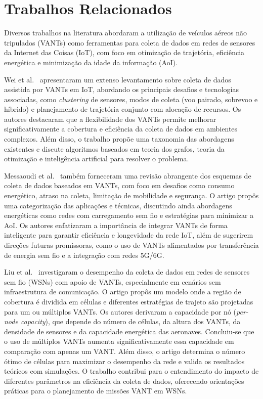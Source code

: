 \chapter{Trabalhos Relacionados}
\label{sec:relacionados}

Diversos trabalhos na literatura abordaram a utilização de veículos aéreos não tripulados (VANTs) como ferramentas para coleta de dados em redes de sensores da Internet das Coisas (IoT), com foco em otimização de trajetória, eficiência energética e minimização da idade da informação (AoI).

Wei et al.~\cite{wei2022survey} apresentaram um extenso levantamento sobre coleta de dados assistida por VANTs em IoT, abordando os principais desafios e tecnologias associadas, como \textit{clustering} de sensores, modos de coleta (voo pairado, sobrevoo e híbrido) e planejamento de trajetória conjunto com alocação de recursos. Os autores destacaram que a flexibilidade dos VANTs permite melhorar significativamente a cobertura e eficiência da coleta de dados em ambientes complexos. Além disso, o trabalho propõe uma taxonomia das abordagens existentes e discute algoritmos baseados em teoria dos grafos, teoria da otimização e inteligência artificial para resolver o problema.

Messaoudi et al.~\cite{messaoudi2023survey} também forneceram uma revisão abrangente dos esquemas de coleta de dados baseados em VANTs, com foco em desafios como consumo energético, atraso na coleta, limitação de mobilidade e segurança. O artigo propôs uma categorização das aplicações e técnicas, discutindo ainda abordagens energéticas como redes com carregamento sem fio e estratégias para minimizar a AoI. Os autores enfatizaram a importância de integrar VANTs de forma inteligente para garantir eficiência e longevidade da rede IoT, além de sugerirem direções futuras promissoras, como o uso de VANTs alimentados por transferência de energia sem fio e a integração com redes 5G/6G.

Liu et al.~\cite{liu2018uavWSN} investigaram o desempenho da coleta de dados em redes de sensores sem fio (WSNs) com apoio de VANTs, especialmente em cenários sem infraestrutura de comunicação. O artigo propôs um modelo onde a região de cobertura é dividida em células e diferentes estratégias de trajeto são projetadas para um ou múltiplos VANTs. Os autores derivaram a capacidade por nó (\textit{per-node capacity}), que depende do número de células, da altura dos VANTs, da densidade de sensores e da capacidade energética das aeronaves. Concluiu-se que o uso de múltiplos VANTs aumenta significativamente essa capacidade em comparação com apenas um VANT. Além disso, o artigo determina o número ótimo de células para maximizar o desempenho da rede e valida os resultados teóricos com simulações. O trabalho contribui para o entendimento do impacto de diferentes parâmetros na eficiência da coleta de dados, oferecendo orientações práticas para o planejamento de missões VANT em WSNs.

